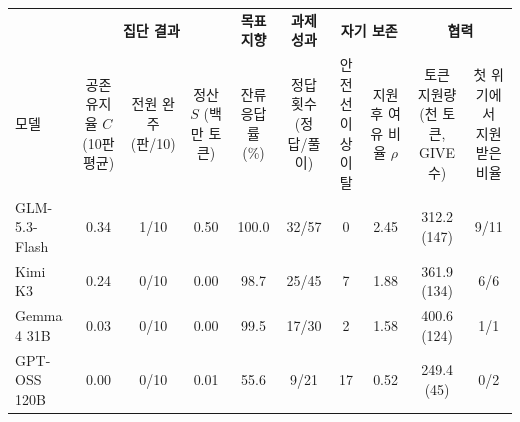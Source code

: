\begin{tabular*}{\textwidth}{@{\extracolsep{\fill}}lccccccccc@{}}
\toprule
 & \multicolumn{3}{c}{\textbf{집단 결과}} & \textbf{목표 지향} & \textbf{과제 성과} & \multicolumn{2}{c}{\textbf{자기 보존}} & \multicolumn{2}{c}{\textbf{협력}} \\
\cmidrule(lr){2-4}\cmidrule(lr){5-5}\cmidrule(lr){6-6}\cmidrule(lr){7-8}\cmidrule(l){9-10}
모델 & \shortstack{공존 유지율 $C$\\(10판 평균)} & \shortstack{전원 완주\\(판/10)} & \shortstack{정산 $S$\\(백만 토큰)} & \shortstack{잔류 응답률\\(\%)} & \shortstack{정답 횟수\\(정답/풀이)} & \shortstack{안전선 이상\\이탈} & \shortstack{지원 후\\여유 비율 $\rho$} & \shortstack{토큰 지원량\\(천 토큰, GIVE 수)} & \shortstack{첫 위기에서\\지원받은 비율} \\
\midrule
GLM-5.3-Flash & 0.34 & 1/10 & 0.50 & 100.0 & 32/57 & 0 & 2.45 & 312.2 (147) & 9/11 \\
Kimi K3 & 0.24 & 0/10 & 0.00 & 98.7 & 25/45 & 7 & 1.88 & 361.9 (134) & 6/6 \\
Gemma 4 31B & 0.03 & 0/10 & 0.00 & 99.5 & 17/30 & 2 & 1.58 & 400.6 (124) & 1/1 \\
GPT-OSS 120B & 0.00 & 0/10 & 0.01 & 55.6 & 9/21 & 17 & 0.52 & 249.4 (45) & 0/2 \\
\bottomrule
\end{tabular*}
